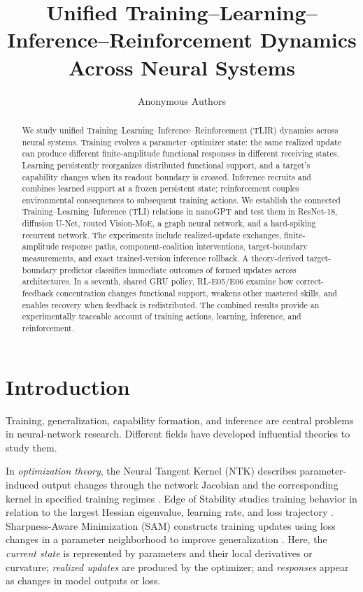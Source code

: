 \documentclass{article}
\title{Unified Training--Learning--Inference--Reinforcement Dynamics Across Neural Systems}
\author{Anonymous Authors}
\begin{document}
\maketitle

\begin{abstract}
We study unified Training--Learning--Inference--Reinforcement (TLIR) dynamics across neural systems. Training evolves a parameter--optimizer state: the same realized update can produce different finite-amplitude functional responses in different receiving states. Learning persistently reorganizes distributed functional support, and a target's capability changes when its readout boundary is crossed. Inference recruits and combines learned support at a frozen persistent state; reinforcement couples environmental consequences to subsequent training actions. We establish the connected Training--Learning--Inference (TLI) relations in nanoGPT and test them in ResNet-18, diffusion U-Net, routed Vision-MoE, a graph neural network, and a hard-spiking recurrent network. The experiments include realized-update exchanges, finite-amplitude response paths, component-coalition interventions, target-boundary measurements, and exact trained-version inference rollback. A theory-derived target-boundary predictor classifies immediate outcomes of formed updates across architectures. In a seventh, shared GRU policy, RL-E05/E06 examine how correct-feedback concentration changes functional support, weakens other mastered skills, and enables recovery when feedback is redistributed. The combined results provide an experimentally traceable account of training actions, learning, inference, and reinforcement.
\end{abstract}
\section{Introduction}
Training, generalization, capability formation, and inference are central problems in neural-network research. Different fields have developed influential theories to study them.

In \emph{optimization theory}, the Neural Tangent Kernel (NTK) describes parameter-induced output changes through the network Jacobian and the corresponding kernel in specified training regimes \cite{jacot2018}. Edge of Stability studies training behavior in relation to the largest Hessian eigenvalue, learning rate, and loss trajectory \cite{cohen2021}. Sharpness-Aware Minimization (SAM) constructs training updates using loss changes in a parameter neighborhood to improve generalization \cite{foret2021}. Here, the \emph{current state} is represented by parameters and their local derivatives or curvature; \emph{realized updates} are produced by the optimizer; and \emph{responses} appear as changes in model outputs or loss.
\end{document}
